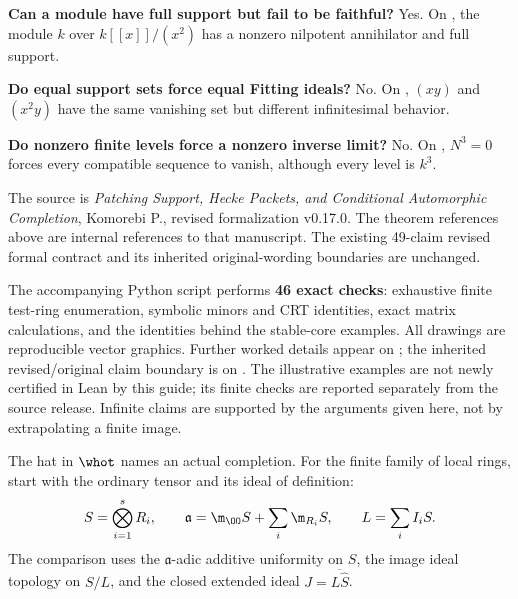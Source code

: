 \textbf{Can a module have full support but fail to be faithful?} Yes. On , the module $k$ over $k[[x]]/(x^2)$ has a nonzero nilpotent annihilator and full support.

\textbf{Do equal support sets force equal Fitting ideals?} No. On , $(xy)$ and $(x^2y)$ have the same vanishing set but different infinitesimal behavior.

\textbf{Do nonzero finite levels force a nonzero inverse limit?} No. On , $N^3=0$ forces every compatible sequence to vanish, although every level is $k^3$.

The source is \emph{Patching Support, Hecke Packets, and Conditional Automorphic Completion}, Komorebi P., revised formalization v0.17.0. The theorem references above are internal references to that manuscript. The existing 49-claim revised formal contract and its inherited original-wording boundaries are unchanged.

The accompanying Python script performs \textbf{46 exact checks}: exhaustive finite test-ring enumeration, symbolic minors and CRT identities, exact matrix calculations, and the identities behind the stable-core examples. All drawings are reproducible vector graphics. Further worked details appear on ; the inherited revised/original claim boundary is on . The illustrative examples are not newly certified in Lean by this guide; its finite checks are reported separately from the source release. Infinite claims are supported by the arguments given here, not by extrapolating a finite image.

\setlength{\parskip}{5pt}
The hat in $\whot$ names an actual completion. For the finite family of local rings, start with the ordinary tensor and its ideal of definition:
\[
 S=\bigotimes_{i=1}^s R_i,\qquad
 \mathfrak a=\m_{\OO}S+\sum_i\m_{R_i}S,\qquad L=\sum_i I_iS.
\]
The comparison uses the $\mathfrak a$-adic additive uniformity on $S$, the image ideal topology on $S/L$, and the closed extended ideal $J=\overline{L\widehat S}$.


